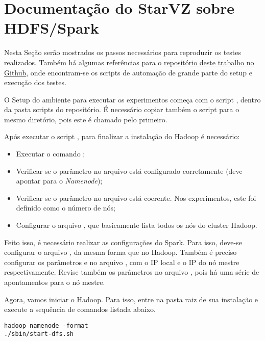 \chapter{Documentação do StarVZ sobre HDFS/Spark}

Nesta Seção serão mostrados os passos necessários para reproduzir os testes 
realizados. Também há algumas referências para o 
\href{https://github.com/aksmiyazaki/tcc-spec}{repositório deste trabalho no 
Github}, onde encontram-se os scripts de automação de grande parte do setup e 
execução dos testes.

O Setup do ambiente para executar os experimentos começa com o script 
, dentro da pasta scripts do repositório. É 
necessário copiar também o script  para o mesmo 
diretório, pois este é chamado pelo primeiro.


Após executar o script , para finalizar 
a instalação do Hadoop é necessário:

\begin{itemize}
 \item Executar o comando ;
 \item Verificar se o parâmetro  no arquivo 
 está configurado corretamente (deve apontar para o 
\emph{Namenode});
 \item Verificar se o parâmetro  no arquivo 
 está coerente. Nos experimentos, este foi definido 
como o número de nós;
\item Configurar o arquivo , que basicamente lista todos os 
nós do cluster Hadoop.
\end{itemize}

Feito isso, é necessário realizar as configurações do Spark. Para isso, deve-se 
configurar o arquivo , da mesma forma que no Hadoop. Também é 
preciso configurar os parâmetros  e 
 no arquivo , com o IP 
local e o IP do nó mestre respectivamente. Revise também os parâmetros no 
arquivo , pois há uma série de apontamentos para o nó 
mestre.

Agora, vamos iniciar o Hadoop. Para isso, entre na pasta raiz de sua instalação 
e execute a sequência de comandos listada abaixo.

\small
\begin{lstlisting}
hadoop namenode -format
./sbin/start-dfs.sh
\end{lstlisting}
\normalsize

